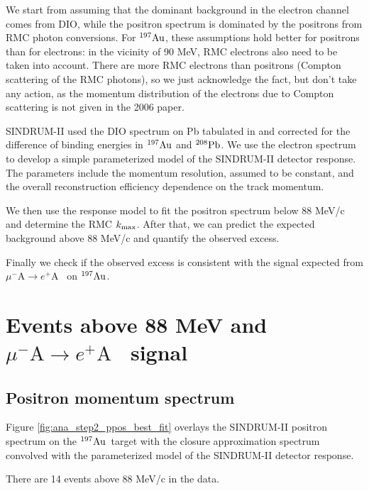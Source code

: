 \documentclass[12pt]{article}
\newcommand {\mumepconv}[1][A] {%
  \def\ArgI{{#1}}%
  \mumepconvRelay
}
\newcommand \mumepconvRelay[1][A]  {\mbox{$\mu^- \textrm{\ArgI} \rightarrow e^+ \textrm{#1}$}}
\newcommand {\Pb}[1]     {\mbox{$\rm ^{#1}Pb$}}                 %
\newcommand {\Au}[1]     {\mbox{$\rm ^{#1}Au$}}                 %
\newcommand {\kmax}      {k_{\rm max}}
\begin{document}
We start from assuming that the dominant background in the electron channel comes from DIO,
while the positron spectrum is dominated by the positrons from RMC photon conversions.
For \Au{197}, these assumptions hold better for positrons than for electrons:
in the vicinity of 90 MeV, RMC electrons also need to be taken into account.
There are more RMC electrons than positrons (Compton scattering of the RMC photons),
so we just acknowledge the fact, but don't take any action, as the momentum distribution
of the electrons due to Compton scattering is not given in the 2006 paper.

SINDRUM-II used the DIO spectrum on Pb tabulated in \cite{Watanabe_1993} and corrected for the
difference of binding energies in \Au{197} and \Pb{208}.
We use the electron spectrum to develop a simple parameterized model of
the SINDRUM-II detector response. The parameters include the momentum resolution,
assumed to be constant, and the overall reconstruction efficiency dependence on the 
track momentum.

We then use the response model to fit the positron spectrum below 88 MeV/c and
determine the RMC $\kmax$. After that, we can predict the expected background
above 88 MeV/c and quantify the observed excess.

Finally we check if the observed excess is consistent with the signal expected from
\mumepconv\ on \Au{197}.




\newpage
\section {Events above 88 MeV and \mumepconv\ signal}


\subsection {Positron momentum spectrum}

Figure \ref{fig:ana_step2_ppos_best_fit} overlays the SINDRUM-II positron spectrum on
the \Au{197}\ target with the closure approximation spectrum convolved with the 
parameterized model of the SINDRUM-II detector response.

There are 14 events above 88 MeV/c in the data.
\end{document}

